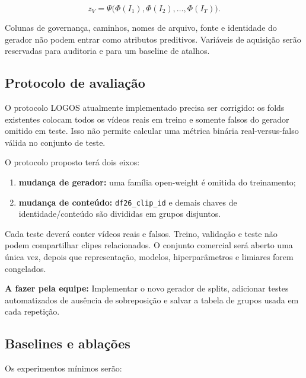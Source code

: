 \documentclass[11pt,a4paper]{article}
\newcommand{\afazer}[1]{%
  \par\smallskip
  \noindent\textcolor{red!70!black}{\textbf{A fazer pela equipe:} #1}
  \par\smallskip
}
\begin{document}
\begin{equation}
  z_V=\Psi\bigl(\Phi(I_1),\Phi(I_2),\ldots,\Phi(I_T)\bigr).
\end{equation}

Colunas de governança, caminhos, nomes de arquivo, fonte e identidade do
gerador não podem entrar como atributos preditivos. Variáveis de aquisição
serão reservadas para auditoria e para um baseline de atalhos.

\subsection{Protocolo de avaliação}

O protocolo LOGOS atualmente implementado precisa ser corrigido: os folds
existentes colocam todos os vídeos reais em treino e somente falsos do gerador
omitido em teste. Isso não permite calcular uma métrica binária real-versus-falso
válida no conjunto de teste.

O protocolo proposto terá dois eixos:

\begin{enumerate}
  \item \textbf{mudança de gerador:} uma família open-weight é omitida do
        treinamento;
  \item \textbf{mudança de conteúdo:} \texttt{df26\_clip\_id} e demais chaves
        de identidade/conteúdo são divididas em grupos disjuntos.
\end{enumerate}

Cada teste deverá conter vídeos reais e falsos. Treino, validação e teste não
podem compartilhar clipes relacionados. O conjunto comercial será aberto uma
única vez, depois que representação, modelos, hiperparâmetros e limiares forem
congelados.

\afazer{Implementar o novo gerador de splits, adicionar testes automatizados de
ausência de sobreposição e salvar a tabela de grupos usada em cada repetição.}

\subsection{Baselines e ablações}

Os experimentos mínimos serão:
\end{document}
